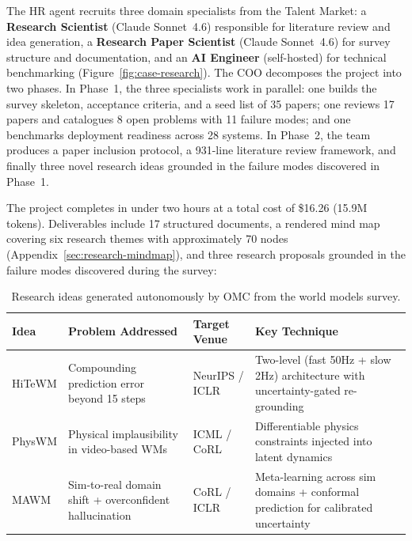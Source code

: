 \documentclass[11pt,a4paper]{article}
\begin{document}
The HR agent recruits three domain specialists from the Talent Market: a \textbf{Research Scientist} (Claude Sonnet~4.6) responsible for literature review and idea generation, a \textbf{Research Paper Scientist} (Claude Sonnet~4.6) for survey structure and documentation, and an \textbf{AI Engineer} (self-hosted) for technical benchmarking (Figure~\ref{fig:case-research}).  The COO decomposes the project into two phases.  In Phase~1, the three specialists work in parallel: one builds the survey skeleton, acceptance criteria, and a seed list of 35 papers; one reviews 17 papers and catalogues 8 open problems with 11 failure modes; and one benchmarks deployment readiness across 28 systems.  In Phase~2, the team produces a paper inclusion protocol, a 931-line literature review framework, and finally three novel research ideas grounded in the failure modes discovered in Phase~1.

The project completes in under two hours at a total cost of \$16.26 (15.9M tokens).  Deliverables include 17 structured documents, a rendered mind map covering six research themes with approximately 70 nodes (Appendix~\ref{sec:research-mindmap}), and three research proposals grounded in the failure modes discovered during the survey:

\begin{table}[H]
\centering
\caption{Research ideas generated autonomously by OMC from the world models survey.}
\label{tab:research-ideas}
\small
\setlength{\tabcolsep}{3pt}
\begin{tabularx}{\textwidth}{@{}>{\raggedright\arraybackslash}p{2.8cm}>{\raggedright\arraybackslash}p{3.5cm}>{\raggedright\arraybackslash}p{2.2cm}X@{}}
\toprule
\textbf{Idea} & \textbf{Problem Addressed} & \textbf{Target Venue} & \textbf{Key Technique} \\
\midrule
HiTeWM & Compounding prediction error beyond 15 steps & NeurIPS / ICLR & Two-level (fast 50Hz + slow 2Hz) architecture with uncertainty-gated re-grounding \\
\addlinespace
PhysWM & Physical implausibility in video-based WMs & ICML / CoRL & Differentiable physics constraints injected into latent dynamics \\
\addlinespace
MAWM & Sim-to-real domain shift + overconfident hallucination & CoRL / ICLR & Meta-learning across sim domains + conformal prediction for calibrated uncertainty \\
\bottomrule
\end{tabularx}
\end{table}
\end{document}
